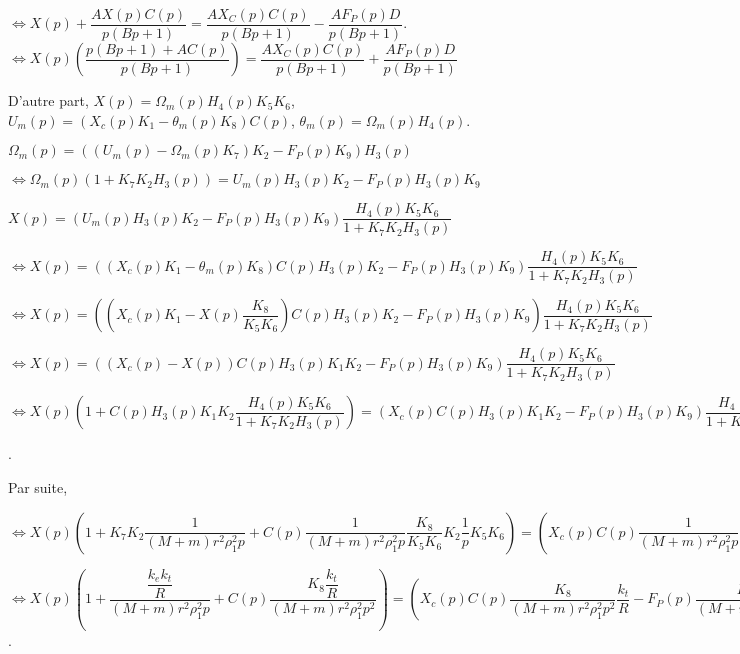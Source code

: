 $\Leftrightarrow X(p)+\dfrac{AX(p)C(p)}{p\left(Bp+1\right)}=\dfrac{AX_C(p)C(p)}{p\left(Bp+1\right)}- \dfrac{AF_P(p) D}{p\left(Bp+1\right)}$.
$\Leftrightarrow X(p)\left(\dfrac{p\left(Bp+1\right)+AC(p)}{p\left(Bp+1\right)}\right)=\dfrac{AX_C(p)C(p)}{p\left(Bp+1\right)}+ \dfrac{AF_P(p) D}{p\left(Bp+1\right)}$



D'autre part, 
$X(p)=\Omega_m(p)H_4(p)K_5K_6$, $U_m(p)=\left(X_c(p)K_1 - \theta_m(p)K_8\right)C(p)$, $\theta_m(p)=\Omega_m(p)H_4(p)$. 

$\Omega_m(p) = \left(\left(U_m(p)-\Omega_m(p) K_7\right)K_2- F_P(p)K_9\right)H_3(p)$

$\Leftrightarrow \Omega_m(p) \left(1+K_7K_2H_3(p)\right)= U_m(p)H_3(p)K_2- F_P(p)H_3(p)K_9$


$X(p)=\left( U_m(p)H_3(p)K_2- F_P(p)H_3(p)K_9 \right)\dfrac{H_4(p)K_5K_6}{1+K_7K_2H_3(p)}$

$\Leftrightarrow X(p)=\left( \left(X_c(p)K_1 - \theta_m(p)K_8\right)C(p)H_3(p)K_2- F_P(p)H_3(p)K_9 \right)\dfrac{H_4(p)K_5K_6}{1+K_7K_2H_3(p)}$

$\Leftrightarrow X(p)=\left( \left(X_c(p)K_1 - X(p)\dfrac{K_8}{K_5K_6}\right)C(p)H_3(p)K_2- F_P(p)H_3(p)K_9 \right)\dfrac{H_4(p)K_5K_6}{1+K_7K_2H_3(p)}$

$\Leftrightarrow X(p)=\left(\left(X_c(p) - X(p)\right)C(p)H_3(p)  K_1K_2- F_P(p)H_3(p)K_9 \right)\dfrac{H_4(p)K_5K_6}{1+K_7K_2H_3(p)}$

$\Leftrightarrow X(p)\left( 1+ C(p)H_3(p)  K_1K_2 \dfrac{H_4(p)K_5K_6}{1+K_7K_2H_3(p)}\right)=\left(X_c(p) C(p)H_3(p)  K_1K_2- F_P(p)H_3(p)K_9 \right)\dfrac{H_4(p)K_5K_6}{1+K_7K_2H_3(p)}$


.




Par suite, 

$\Leftrightarrow X(p)\left( 1+K_7K_2 \dfrac{1}{\left(M+m\right)r^2\rho_1^2 p} + C(p)\dfrac{1}{\left(M+m\right)r^2\rho_1^2 p}  \dfrac{K_8}{K_5 K_6} K_2 \dfrac{1}{p} K_5K_6\right)=\left(X_c(p) C(p)\dfrac{1}{\left(M+m\right)r^2\rho_1^2 p}  \dfrac{K_8}{K_5 K_6} K_2- F_P(p)\dfrac{1}{\left(M+m\right)r^2\rho_1^2 p} K_9 \right)\dfrac{1}{p}K_5K_6$

$\Leftrightarrow X(p)\left( 1+ \dfrac{ \dfrac{k_ek_t}{R}}{\left(M+m\right)r^2\rho_1^2 p} + C(p)\dfrac{K_8 \dfrac{k_t}{R}}{\left(M+m\right)r^2\rho_1^2 p^2} \right)
=
\left(X_c(p) C(p)\dfrac{K_8}{\left(M+m\right)r^2\rho_1^2 p^2}  \dfrac{k_t}{R}- F_P(p)\dfrac{K_9}{\left(M+m\right)r\rho_1 p^2}  \right)$.

